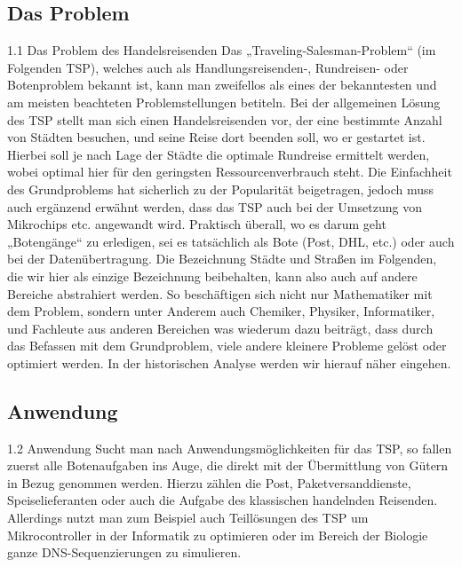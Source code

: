 \documentclass[a4paper]{article}
\begin{document}
		\subsection{Das Problem}
		1.1 Das Problem des Handelsreisenden
Das „Traveling-Salesman-Problem“ (im Folgenden TSP), welches auch als Handlungsreisenden-, Rundreisen- oder Botenproblem bekannt ist, kann man zweifellos als eines der bekanntesten und am meisten beachteten  Problemstellungen betiteln.
Bei der allgemeinen Lösung des TSP stellt man sich einen Handelsreisenden vor, der eine bestimmte Anzahl von Städten besuchen, und seine Reise dort beenden soll, wo er gestartet ist. Hierbei soll je nach Lage der Städte die optimale Rundreise ermittelt werden, wobei optimal hier für den geringsten Ressourcenverbrauch steht.
Die Einfachheit des Grundproblems hat sicherlich zu der Popularität beigetragen, jedoch muss auch ergänzend erwähnt werden, dass das TSP auch bei der Umsetzung von Mikrochips etc. angewandt wird. Praktisch überall, wo es darum geht „Botengänge“ zu erledigen, sei es tatsächlich als Bote (Post, DHL, etc.) oder auch bei der Datenübertragung. Die Bezeichnung Städte und Straßen im Folgenden, die wir hier als einzige Bezeichnung beibehalten, kann also auch auf andere Bereiche abstrahiert werden.
So beschäftigen sich nicht nur Mathematiker mit dem Problem, sondern unter Anderem auch Chemiker, Physiker, Informatiker, und Fachleute aus anderen Bereichen was wiederum dazu beiträgt, dass durch das Befassen mit dem Grundproblem, viele andere kleinere Probleme gelöst oder optimiert werden. In der historischen Analyse werden wir hierauf näher eingehen.
\vspace{100pt}
		\subsection{Anwendung}
		1.2 Anwendung
Sucht man nach Anwendungsmöglichkeiten für das TSP, so fallen zuerst alle Botenaufgaben ins Auge, die direkt mit der Übermittlung von Gütern in Bezug genommen werden.  Hierzu zählen die Post, Paketversanddienste, Speiselieferanten oder auch die Aufgabe des klassischen handelnden Reisenden.
Allerdings nutzt man zum Beispiel auch Teillösungen des TSP um Mikrocontroller in der Informatik zu optimieren oder im Bereich der Biologie ganze DNS-Sequenzierungen zu simulieren.
\newpage
\end{document}
